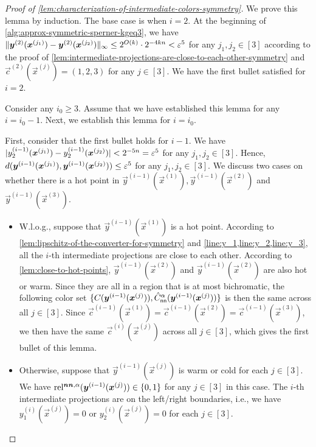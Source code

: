 \begin{proof}[Proof of \cref{lem:characterization-of-intermediate-colors-symmetry}]
    We prove this lemma by induction.
    The base case is when $i=2$. 
    At the beginning of \cref{alg:approx-symmetric-sperner-kgeq3}, we have $\normtxt{\vec{y}^{(2)}(\vec{x}^{(j_1)})-\vec{y}^{(2)}(\vec{x}^{(j_2)})}\infty\leq 2^{O(k)}\cdot 2^{-4kn}<\eps^5$ for any $j_1,j_2\in [3]$ according to the proof of \cref{lem:intermediate-projections-are-close-to-each-other-symmetry} and $\vec{c}^{(2)}(\vec{x}^{(j)})=(1,2,3)$ for any $j\in [3]$. 
    We have the first bullet satisfied for $i=2$. 

    Consider any $i_0\geq 3$. Assume that we have established this lemma for any $i=i_0-1$. 
    Next, we establish this lemma for $i=i_0$.

    First, consider that the first bullet holds for $i-1$. We have $\abstxt{y_2^{(i-1)}(\vec{x}^{(j_1)})-y_2^{(i-1)}(\vec{x}^{(j_2)})}< 2^{-5n}=\eps^5$ for any $j_1,j_2\in [3]$. 
    Hence, $d(\vec{y}^{(i-1)}(\vec{x}^{(j_1)}), \vec{y}^{(i-1)}(\vec{x}^{(j_2)}))\leq \eps^5$ for any $j_1,j_2\in [3]$. 
    We discuss two cases on whether there is a hot point in $\vec{y}^{(i-1)}(\vec{x}^{(1)}), \vec{y}^{(i-1)}(\vec{x}^{(2)})$ and $\vec{y}^{(i-1)}(\vec{x}^{(3)})$. 
    \begin{itemize}[itemsep=0.2em,topsep=0.5em]
        \item W.l.o.g., suppose that $\vec{y}^{(i-1)}(\vec{x}^{(1)})$ is a hot point. 
        According to \cref{lem:lipschitz-of-the-converter-for-symmetry} and \cref{line:y_1,line:y_2,line:y_3}, all the $i$-th intermediate projections are close to each other. 
        According to \cref{lem:close-to-hot-points}, $\vec{y}^{(i-1)}(\vec{x}^{(2)})$ and $\vec{y}^{(i-1)}(\vec{x}^{(2)})$ are also hot or warm.
        Since they are all in a region that is at most bichromatic, 
        the following color set $\{C(\vec{y}^{(i-1)}(\vec{x}^{(j)})), \hat{C}^\alpha_{\sf nn}(\vec{y}^{(i-1)}(\vec{x}^{(j)}))\}$ is then the same across all $j\in [3]$.
        Since $\vec{c}^{(i-1)}(\vec{x}^{(1)})=\vec{c}^{(i-1)}(\vec{x}^{(2)})=\vec{c}^{(i-1)}(\vec{x}^{(3)})$, we then have the same $\vec{c}^{(i)}(\vec{x}^{(j)})$ across all $j\in [3]$, which gives the first bullet of this lemma. 
        \item Otherwise, suppose that $\vec{y}^{(i-1)}(\vec{x}^{(j)})$ is warm or cold for each $j\in [3]$. We have $\rela(\vec{y}^{(i-1)}(\vec{x}^{(j)}))\in \{0,1\}$ for any $j\in [3]$ in this case.
        The $i$-th intermediate projections are on the left/right boundaries, i.e., we have $y_1^{(i)}(\vec{x}^{(j)})=0$ or $y_2^{(i)}(\vec{x}^{(j)})=0$ for each $j\in [3]$.

\end{itemize}
\end{proof}
